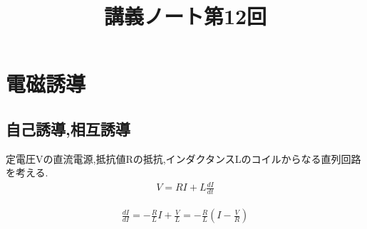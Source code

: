 \documentclass{jsarticle}
\title{講義ノート第12回}
\author{}
\date{}
\begin{document}
\maketitle

\setcounter{section}{2}

\section{電磁誘導}

\setcounter{subsection}{1}

\subsection{自己誘導,相互誘導}
定電圧Vの直流電源,抵抗値Rの抵抗,インダクタンスLのコイルからなる直列回路を考える.
\begin{eqnarray}
V=RI+L\frac{dI}{dt}
\end{eqnarray}

\begin{eqnarray*}
\frac{dI}{dI} = - \frac{R}{L}I + \frac{V}{L} = -\frac{R}{L} \left( I - \frac{V}{R} \right)
\end{eqnarray*}
\end{document}
